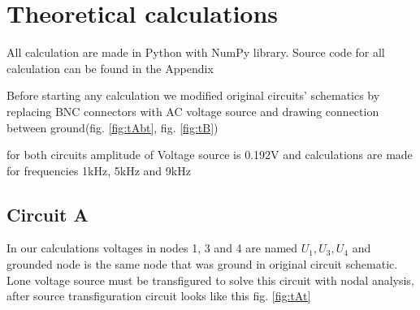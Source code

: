 \documentclass[notitlepage, a4paper, 11pt]{article}
\begin{document}
	\section{Theoretical calculations}
	All calculation are made in Python with NumPy library. Source code for all calculation can be found in the Appendix
	
	Before starting any calculation we modified original circuits' schematics by replacing BNC connectors with AC voltage source and drawing connection between ground(fig. \ref{fig:tAbt}, fig. \ref{fig:tB})
	
	for both circuits amplitude of Voltage source is 0.192V and calculations are made for frequencies 1kHz, 5kHz and 9kHz 
	\subsection{Circuit A}
	In our calculations voltages in nodes 1, 3 and 4 are named $U_1, U_3, U_4$ and grounded node is the same node that was ground in original circuit schematic. Lone voltage source must be transfigured to solve this circuit with nodal analysis, after source transfiguration circuit looks like this fig. \ref{fig:tAt}
	
\end{document}
